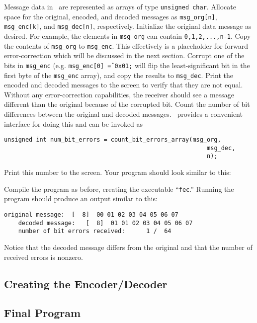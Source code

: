 Message data in \liquid\ are represented as arrays of type
{\tt unsigned char}.
Allocate space for the original, encoded, and decoded messages as
{\tt msg\_org[n]},
{\tt msg\_enc[k]}, and
{\tt msg\_dec[n]}, respectively.
Initialize the original data message as desired.
For example, the elements in {\tt msg\_org} can contain
{\tt 0,1,2,...,n-1}.
Copy the contents of {\tt msg\_org} to {\tt msg\_enc}.
This effectively is a placeholder for forward error-correction which
will be discussed in the next section. %
Corrupt one of the bits in {\tt msg\_enc}
(e.g. {\tt msg\_enc[0] \^= 0x01;} will flip the least-significant bit in
the first byte of the {\tt msg\_enc} array),
and copy the results to {\tt msg\_dec}.
Print the encoded and decoded messages to the screen to verify that they
are not equal.
Without any error-correction capabilities, the receiver should see a
message different than the original because of the corrupted bit.
Count the number of bit differences between the original and decoded
messages.
\liquid\ provides a convenient interface for doing this and can be
invoked as
%
\begin{Verbatim}[fontsize=\small]
    unsigned int num_bit_errors = count_bit_errors_array(msg_org,
                                                         msg_dec,
                                                         n);
\end{Verbatim}
%
Print this number to the screen.
Your program should look similar to this:
%

%
Compile the program as before, creating the executable ``{\tt fec}.''
Running the program should produce an output similar to this:
%
\begin{Verbatim}[fontsize=\small]
    original message:  [  8]  00 01 02 03 04 05 06 07
    decoded message:   [  8]  01 01 02 03 04 05 06 07
    number of bit errors received:      1 /  64
\end{Verbatim}
%
Notice that the decoded message differs from the original and that the
number of received errors is nonzero.


%
%
\subsection{Creating the Encoder/Decoder}
\label{tutorial:fec:codec}

\subsection{Final Program}
\label{tutorial:fec:completed}

